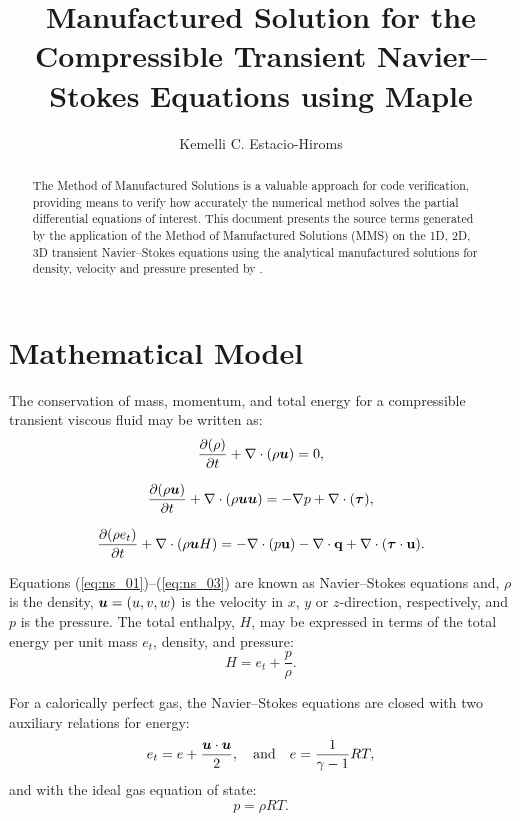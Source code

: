 \documentclass[10pt]{article}
\title{Manufactured Solution for the Compressible Transient Navier--Stokes Equations using Maple}
\author{Kemelli C. Estacio-Hiroms}
\newcommand{\Diff}[2] {\dfrac{\partial( #1)}{\partial #2}}
\newcommand{\bv}[1]{\ensuremath{\mbox{\boldmath$ #1 $}}}
\begin{document}
\maketitle

\begin{abstract}
The Method of Manufactured Solutions is a valuable approach for code verification, providing means to verify how accurately the numerical method solves the partial differential equations of interest.
This document presents the source terms generated by the application of the Method of Manufactured Solutions (MMS) on the 1D, 2D, 3D transient Navier--Stokes equations using the analytical manufactured solutions for density, velocity and pressure presented by \citet{Roy2002}.
\end{abstract}





\section{Mathematical Model}
The conservation of mass, momentum, and total energy for a compressible transient viscous fluid may be written as:
\begin{equation}
 \label{eq:ns_01}
\Diff{\rho}{t} +\nabla \cdot \left(\rho \bv{u}\right) = 0,
\end{equation}

\begin{equation}
 \label{eq:ns_02}
\Diff{\rho \bv{u}}{t} +\nabla\cdot\left(\rho\bv{u}\bv{u}\right) = -\nabla p+  \nabla \cdot (\bv{\tau} ),
\end{equation}

\begin{equation}
 \label{eq:ns_03}
\Diff{\rho e_t}{t} +\nabla\cdot\left(\rho \bv{u} H\right) =-   \nabla\cdot(p  \mathbf{u}) -\nabla\cdot \mathbf{q} +  \nabla \cdot (\bv{\tau} \cdot \mathbf{u}).
\end{equation}


Equations (\ref{eq:ns_01})--(\ref{eq:ns_03}) are known as Navier--Stokes equations and, $\rho$ is the density, $\bv{u}=(u,v,w)$ is the velocity in $x$, $y$ or $z$-direction, respectively,    and $p$ is the pressure. The total enthalpy, $H$, may be expressed in terms of the total energy per unit mass $e_t$, density, and pressure:
$$H = e_t + \dfrac{p}{\rho}.$$

For a calorically perfect gas, the Navier--Stokes equations are closed with two auxiliary relations for energy:
\begin{equation}
 \label{eq:ns_04}
e_t= e+\dfrac{\bv{u}\cdot \bv{u}}{2},\quad\mbox{and}\quad e=\dfrac{1}{\gamma -1}RT ,
\end{equation}
and with the ideal gas equation of state:
\begin{equation}
 \label{eq:ns_05}
p=\rho RT.
\end{equation}
\end{document}
